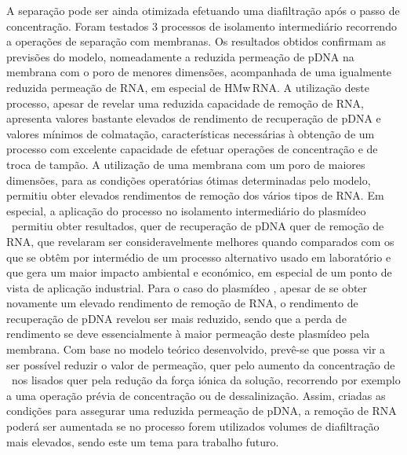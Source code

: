 A separação pode ser ainda otimizada efetuando uma diafiltração após o passo de concentração. Foram testados 3 processos de isolamento intermediário recorrendo a operações de separação com membranas. Os resultados obtidos confirmam as previsões do modelo, nomeadamente a reduzida permeação de pDNA na membrana com o poro de menores dimensões, acompanhada de uma igualmente reduzida permeação de RNA, em especial de HMw\,RNA. A utilização deste processo, apesar de revelar uma reduzida capacidade de remoção de RNA, apresenta valores bastante elevados de rendimento de recuperação de pDNA e valores mínimos de colmatação, características necessárias à obtenção de um processo com excelente capacidade de efetuar operações de concentração e de troca de tampão. A utilização de uma membrana com um poro de maiores dimensões, para as condições operatórias ótimas determinadas pelo modelo, permitiu obter elevados rendimentos de remoção dos vários tipos de RNA. Em especial, a aplicação do processo no isolamento intermediário do plasmídeo \pCAMBIA\ permitiu obter resultados, quer de recuperação de pDNA quer de remoção de RNA, que revelaram ser consideravelmente melhores quando comparados com os que se obtêm por intermédio de um processo alternativo usado em laboratório e que gera um maior impacto ambiental e económico, em especial de um ponto de vista de aplicação industrial. Para o caso do plasmídeo \pVAX, apesar de se obter novamente um elevado rendimento de remoção de RNA, o rendimento de recuperação de pDNA revelou ser mais reduzido, sendo que a perda de rendimento se deve essencialmente à maior permeação deste plasmídeo pela membrana. Com base no modelo teórico desenvolvido, prevê-se que possa vir a ser possível reduzir o valor de permeação, quer pelo aumento da concentração de \pVAX\ nos lisados quer pela redução da força iónica da solução, recorrendo por exemplo a uma operação prévia de concentração ou de dessalinização. Assim, criadas as condições para assegurar uma reduzida permeação de pDNA, a remoção de RNA poderá ser aumentada se no processo forem utilizados volumes de diafiltração mais elevados, sendo este um tema para trabalho futuro.
